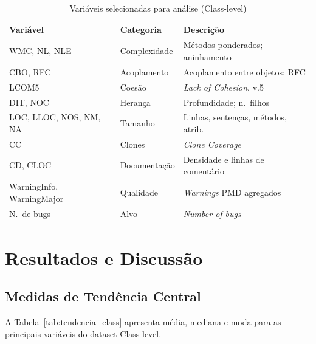 \documentclass[conference]{IEEEtran}
\begin{document}
\begin{table}[htbp]
\caption{Variáveis selecionadas para análise (Class-level)}
\label{tab:selecao}
\centering
\scriptsize
\setlength{\tabcolsep}{3pt}
\renewcommand{\arraystretch}{1.15}
\begin{tabular}{@{}p{}p{}p{}@{}}
\toprule
\textbf{Variável} & \textbf{Categoria} & \textbf{Descrição} \\
\midrule
WMC, NL, NLE              & Complexidade  & Métodos ponderados; aninhamento \\
CBO, RFC                  & Acoplamento   & Acoplamento entre objetos; RFC \\
LCOM5                     & Coesão        & \textit{Lack of Cohesion}, v.5 \\
DIT, NOC                  & Herança       & Profundidade; n.\ filhos \\
LOC, LLOC, NOS, NM, NA    & Tamanho       & Linhas, sentenças, métodos, atrib. \\
CC                        & Clones        & \textit{Clone Coverage} \\
CD, CLOC                  & Documentação  & Densidade e linhas de comentário \\
WarningInfo, WarningMajor & Qualidade     & \textit{Warnings} PMD agregados \\
N.\ de bugs               & Alvo          & \textit{Number of bugs} \\
\bottomrule
\end{tabular}
\end{table}

\section{Resultados e Discussão}\label{sec:resultados}

\subsection{Medidas de Tendência Central}

A Tabela~\ref{tab:tendencia_class} apresenta média, mediana e moda para as principais variáveis do dataset Class-level.
\end{document}
